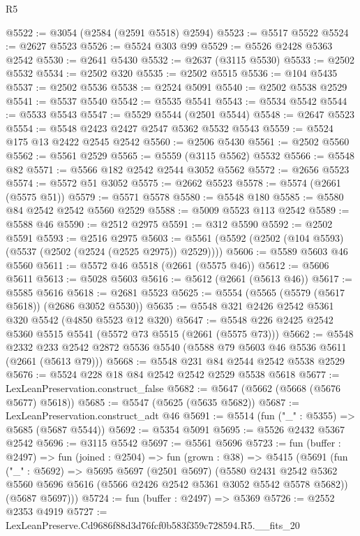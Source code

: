 \begin{lexlean}{R5}
\begin{coremodule}
@5522 := @3054 (@2584 (@2591 @5518) @2594)
@5523 := @5517 @5522
@5524 := @2627 @5523
@5526 := @5524 @303 @99
@5529 := @5526 @2428 @5363 @2542
@5530 := @2641 @5430
@5532 := @2637 (@3115 @5530)
@5533 := @2502 @5532
@5534 := @2502 @320
@5535 := @2502 @5515
@5536 := @104 @5435
@5537 := @2502 @5536
@5538 := @2524 @5091
@5540 := @2502 @5538 @2529
@5541 := @5537 @5540
@5542 := @5535 @5541
@5543 := @5534 @5542
@5544 := @5533 @5543
@5547 := @5529 @5544 (@2501 @5544)
@5548 := @2647 @5523
@5554 := @5548 @2423 @2427 @2547 @5362 @5532 @5543
@5559 := @5524 @175 @13 @2422 @2545 @2542
@5560 := @2506 @5430
@5561 := @2502 @5560
@5562 := @5561 @2529
@5565 := @5559 (@3115 @5562) @5532
@5566 := @5548 @82
@5571 := @5566 @182 @2542 @2544 @3052 @5562
@5572 := @2656 @5523
@5574 := @5572 @51 @3052
@5575 := @2662 @5523
@5578 := @5574 (@2661 (@5575 @51))
@5579 := @5571 @5578
@5580 := @5548 @180
@5585 := @5580 @84 @2542 @2542 @5560 @2529
@5588 := @5009 @5523 @113 @2542
@5589 := @5588 @46
@5590 := @2512 @2975
@5591 := @312 @5590
@5592 := @2502 @5591
@5593 := @2516 @2975
@5603 := @5561 (@5592 (@2502 (@104 @5593) (@5537 (@2502 (@2524 (@2525 @2975)) @2529))))
@5606 := @5589 @5603 @46 @5560
@5611 := @5572 @46 @5518 (@2661 (@5575 @46))
@5612 := @5606 @5611
@5613 := @5028 @5603
@5616 := @5612 (@2661 (@5613 @46))
@5617 := @5585 @5616
@5618 := @2681 @5523
@5625 := @5554 (@5565 (@5579 (@5617 @5618)) (@2686 @3052 @5530))
@5635 := @5548 @321 @2426 @2542 @5361 @320 @5542 (@4850 @5523 @12 @320)
@5647 := @5548 @226 @2425 @2542 @5360 @5515 @5541 (@5572 @73 @5515 (@2661 (@5575 @73)))
@5662 := @5548
    @2332
    @233
    @2542
    @2872
    @5536
    @5540
    (@5588 @79 @5603 @46 @5536 @5611 (@2661 (@5613 @79)))
@5668 := @5548 @231 @84 @2544 @2542 @5538 @2529
@5676 := @5524 @228 @18 @84 @2542 @2542 @2529 @5538 @5618
@5677 := LexLeanPreservation.construct_false
@5682 := @5647 (@5662 (@5668 (@5676 @5677) @5618))
@5685 := @5547 (@5625 (@5635 @5682))
@5687 := LexLeanPreservation.construct_adt @46
@5691 := @5514 (fun ("_" : @5355) => @5685 (@5687 @5544))
@5692 := @5354 @5091
@5695 := @5526 @2432 @5367 @2542
@5696 := @3115 @5542
@5697 := @5561 @5696
@5723 := fun (buffer : @2497) =>
  fun (joined : @2504) =>
  fun (grown : @38) =>
  @5415
    (@5691
      (fun ("_" : @5692) =>
      @5695
        @5697
        (@2501 @5697)
        (@5580
          @2431
          @2542
          @5362
          @5560
          @5696
          @5616
          (@5566 @2426 @2542 @5361 @3052 @5542 @5578 @5682))
        (@5687 @5697)))
@5724 := fun (buffer : @2497) => @5369
@5726 := @2552 @2353 @4919
@5727 := LexLeanPreserve.Cd9686f88d3d76fcf0b583f359c728594.R5.__fits_20

\end{coremodule}
\end{lexlean}
